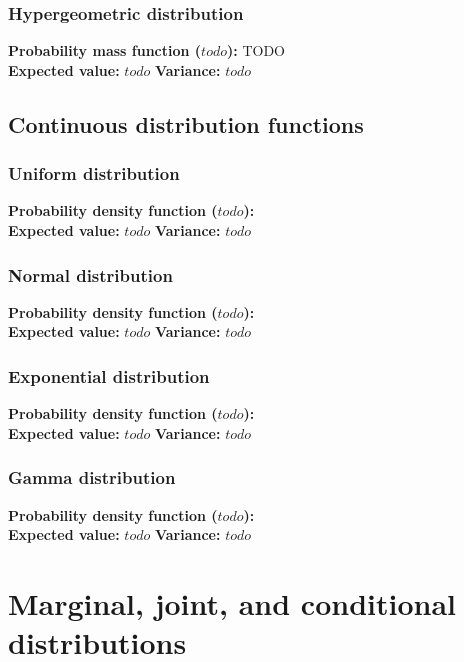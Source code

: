 \documentclass{article}
\begin{document}
\subsubsection{Hypergeometric distribution}
\textbf{Probability mass function ($todo$):} TODO
\begin{equation*}
\end{equation*}
\textbf{Expected value:} $todo$
\textbf{Variance:} $todo$


\subsection{Continuous distribution functions}
\subsubsection{Uniform distribution}
\textbf{Probability density function ($todo$):}
\begin{equation*}
\end{equation*}
\textbf{Expected value:} $todo$
\textbf{Variance:} $todo$

\subsubsection{Normal distribution}
\textbf{Probability density function ($todo$):}
\begin{equation*}
\end{equation*}
\textbf{Expected value:} $todo$
\textbf{Variance:} $todo$

\subsubsection{Exponential distribution}
\textbf{Probability density function ($todo$):}
\begin{equation*}
\end{equation*}
\textbf{Expected value:} $todo$
\textbf{Variance:} $todo$

\subsubsection{Gamma distribution}
\textbf{Probability density function ($todo$):}
\begin{equation*}
\end{equation*}
\textbf{Expected value:} $todo$
\textbf{Variance:} $todo$

\section{Marginal, joint, and conditional distributions}
\end{document}
